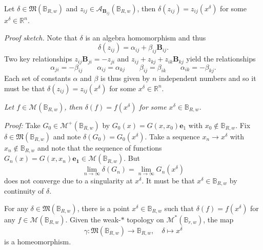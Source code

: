 \documentclass[aspectratio=169,handout]{beamer}
\newcommand{\R}{\mathbb{R}}
\newcommand{\algebra}{\mathcal{A}}
\newcommand{\characters}{\mathfrak{M}}
\newcommand{\monogenics}{\mathcal{M}}
\newcommand{\dualmonogenics}{\mathcal{M}^*}
\newcommand{\ball}{\mathbb{B}}
\newcommand{\blade}[1]{\boldsymbol{#1}}
\newcommand{\bivector}{\blade{B}}
\begin{document}
\begin{frame}{}
\vfill
\begin{lemma}
Let $\delta \in \characters(\ball_{R,w})$ and $z_{ij}\in \algebra_{\bivector_{ij}}(\ball_{R,w})$, then $\delta(z_{ij})=z_{ij}(x^\delta)$ for some $x^\delta \in \R^n$.
\end{lemma}
\emph{Proof sketch.} Note that $\delta$ is an algebra homomorphism and thus 
\[
\delta(z_{ij})=\alpha_{ij}+\beta_{ij}\bivector_{ij}.
\]
Two key relationships $z_{ij}\bivector_{ji}=-z_{ji}$ and $z_{ij}+z_{kj}+z_{ik}\bivector_{kj}$ yield the relationships
\[
\alpha_{ji}=-\beta_{ij} \qquad \alpha_{ij}=\alpha_{kj} \qquad \beta_{ij}=\beta_{ik} \qquad \alpha_{ik}=-\beta_{kj}.
\]
Each set of constants $\alpha$ and $\beta$ is thus given by $n$ independent numbers and so it must be that $\delta(z_{ij})=z_{ij}(x^\delta)$ for some $x^\delta \in \R^n$.
\vfill
\end{frame}

\begin{frame}{}
\vfill
\begin{lemma}[Identification]
\emph{Let $f\in \mathcal{M}(\ball_{R,w})$, then $\delta (f)=f(x^\delta)$ for some $x^\delta \in \ball_{R,w}$.}
\end{lemma}
\emph{Proof:} Take $G_0 \in \monogenics^+(\ball_{R,w})$ by $G_0(x) = G(x,x_0)\blade{e}_1$ with $x_0 \notin \ball_{R,w}$. Fix $\delta \in \characters(\ball_{R,w})$ and note $\delta(G_0)=G_0(x^\delta)$. Take a sequence $x_n \to x^\delta$ with $x_n \notin \ball_{R,w}$ and note that the sequence of functions $G_n(x)=G(x,x_n)\blade{e_1} \in \monogenics(\ball_{R,w})$. But 
\[
\lim_{n\to \infty} \delta(G_n) = \lim_{n\to \infty} G_n(x^\delta)
\]
does not converge due to a singularity at $x^\delta$. It must be that $x^\delta \in \ball_{R,w}$ by continuity of $\delta$.
\vfill
\end{frame}

\begin{frame}{}
\vfill
\begin{theorem}
For any $\delta \in \characters(\ball_{R,w})$, there is a point $x^\delta \in \ball_{R,w}$ such that $\delta(f)=f(x^\delta)$ for any $f\in \monogenics(\ball_{R,w})$. Given the weak-$\ast$ topology on $\dualmonogenics(\ball_{r,w})$, the map
\[
\gamma \colon \characters(\ball_{R,w}) \to \ball_{R,w}, \quad \delta \mapsto x^\delta
\]
is a homeomorphism.
\end{theorem}
\vfill
\end{frame}
\end{document}

